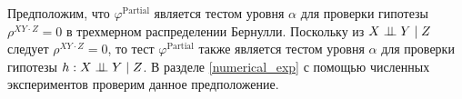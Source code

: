 Предположим, что $\varphi^{\text{Partial}}$ является тестом
уровня $\alpha$ для проверки гипотезы $\rho^{XY \cdot Z}=0$ в трехмерном распределении Бернулли. 
Поскольку из $X \perp\!\!\!\perp Y \mid Z$ следует $\rho^{XY\cdot Z}=0$, то 
тест $\varphi^{\text{Partial}}$ также является тестом
уровня $\alpha$ для проверки гипотезы $h: X \perp\!\!\!\perp Y \mid Z$.
В разделе \ref{numerical_exp} с помощью численных экспериментов 
проверим данное предположение.


